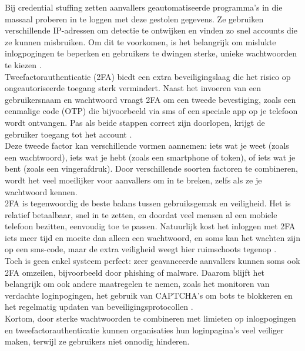 Bij credential stuffing zetten aanvallers geautomatiseerde programma’s in die massaal proberen in te loggen met deze gestolen gegevens. Ze gebruiken verschillende IP-adressen om detectie te ontwijken en vinden zo snel accounts die ze kunnen misbruiken. Om dit te voorkomen, is het belangrijk om mislukte inlogpogingen te beperken en gebruikers te dwingen sterke, unieke wachtwoorden te kiezen \autocite{Chinnasamy2025}.\\

Tweefactorauthenticatie (2FA) biedt een extra beveiligingslaag die het risico op ongeautoriseerde toegang sterk vermindert. Naast het invoeren van een gebruikersnaam en wachtwoord vraagt 2FA om een tweede bevestiging, zoals een eenmalige code (OTP) die bijvoorbeeld via sms of een speciale app op je telefoon wordt ontvangen. Pas als beide stappen correct zijn doorlopen, krijgt de gebruiker toegang tot het account \autocite{Jurisons2024}.\\

Deze tweede factor kan verschillende vormen aannemen: iets wat je weet (zoals een wachtwoord), iets wat je hebt (zoals een smartphone of token), of iets wat je bent (zoals een vingerafdruk). Door verschillende soorten factoren te combineren, wordt het veel moeilijker voor aanvallers om in te breken, zelfs als ze je wachtwoord kennen.\\

2FA is tegenwoordig de beste balans tussen gebruiksgemak en veiligheid. Het is relatief betaalbaar, snel in te zetten, en doordat veel mensen al een mobiele telefoon bezitten, eenvoudig toe te passen. Natuurlijk kost het inloggen met 2FA iets meer tijd en moeite dan alleen een wachtwoord, en soms kan het wachten zijn op een sms-code, maar de extra veiligheid weegt hier ruimschoots tegenop \autocite{Jurisons2024}.\\

Toch is geen enkel systeem perfect: zeer geavanceerde aanvallers kunnen soms ook 2FA omzeilen, bijvoorbeeld door phishing of malware. Daarom blijft het belangrijk om ook andere maatregelen te nemen, zoals het monitoren van verdachte loginpogingen, het gebruik van CAPTCHA’s om bots te blokkeren en het regelmatig updaten van beveiligingsprotocollen \autocite{Chinnasamy2025}.\\

Kortom, door sterke wachtwoorden te combineren met limieten op inlogpogingen en tweefactorauthenticatie kunnen organisaties hun loginpagina’s veel veiliger maken, terwijl ze gebruikers niet onnodig hinderen.\\

